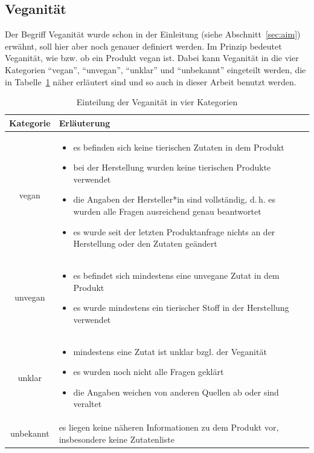 \subsection{Veganität}
\label{sec:veganity}

Der Begriff Veganität wurde schon in der Einleitung (siehe
Abschnitt~\ref{sec:aim}) erwähnt, soll hier
aber noch genauer definiert werden.
Im Prinzip bedeutet Veganität, wie bzw. ob ein Produkt vegan ist.
Dabei kann Veganität in die vier Kategorien "`vegan"', "`unvegan"',
"`unklar"' und "`unbekannt"' eingeteilt
werden, die in Tabelle~\ref{table:veganity} näher erläutert sind und so auch
in dieser Arbeit benutzt werden.

\begin{table}[ht]%
\centering
\begin{tabular}{c|m{12cm}}
\rowcolor{gray!50}
\textbf{Kategorie} & \textbf{Erläuterung}\\
\hline
vegan & \begin{itemize}[noitemsep]
	\item es befinden sich keine tierischen Zutaten in dem Produkt
	\item bei der Herstellung wurden keine tierischen Produkte verwendet
	\item die Angaben der Hersteller*in sind vollständig, d.\,h. es
			wurden alle Fragen ausreichend genau beantwortet
	\item es wurde seit der letzten Produktanfrage nichts an der
			Herstellung oder den Zutaten geändert
\end{itemize}\\
unvegan & \begin{itemize}[noitemsep]
	\item es befindet sich mindestens eine unvegane Zutat in dem
Produkt
	\item es wurde mindestens ein tierischer Stoff in der Herstellung
			verwendet
\end{itemize}\\
unklar & \begin{itemize}[noitemsep]
	\item mindestens eine Zutat ist unklar bzgl. der Veganität
	\item es wurden noch nicht alle Fragen geklärt
	\item die Angaben weichen von anderen Quellen ab oder sind
			veraltet
\end{itemize}\\
unbekannt & es liegen keine näheren Informationen zu dem Produkt vor,
insbesondere keine Zutatenliste
\end{tabular}
\caption[Einteilung der Veganität in vier Kategorien]{Einteilung der Veganität 
in vier
Kategorien }
\label{table:veganity}
\end{table}%

